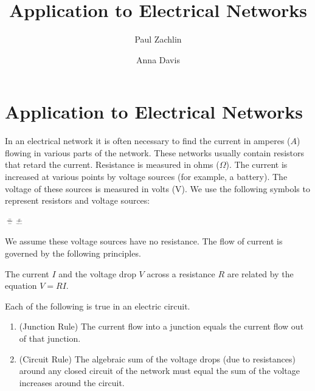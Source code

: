 \documentclass{ximera}
\author{Paul Zachlin \and Anna Davis} \title{Application to Electrical Networks} \license{CC-BY 4.0}
\begin{document}
\begin{abstract}
\end{abstract}
\maketitle

\section*{Application to Electrical Networks}
In an electrical network it is often necessary to find the current in amperes ($A$) flowing in various parts of the network. These networks usually contain resistors that retard the current. Resistance is measured in ohms ($\Omega$). The current is increased at various points by voltage sources (for example, a battery). The voltage of these sources is measured in volts (V). We use the following symbols to represent resistors and voltage sources:
\begin{image}
   \includegraphics[height=0.1in]{circuit7.jpg}~
 \end{image}

We assume these voltage sources have no resistance. The flow of current is governed by the following principles.

\begin{theorem}\label{001806}

The current $I$ and the voltage drop $V$ across a resistance $R$ are related by the equation $V = RI$.

\end{theorem}

\begin{theorem}\label{001809}
    Each of the following is true in an electric circuit.
\begin{enumerate}
    \item\label{item:001809j}(Junction Rule) The current flow into a junction equals the current flow out of that junction.
    \item\label{item:001809c}(Circuit Rule) The algebraic sum of the voltage drops (due to resistances) around any closed circuit of the network must equal the sum of the voltage increases around the circuit.
\end{enumerate}

\end{theorem}
\end{document}
